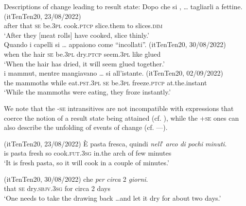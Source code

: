 \documentclass[output=paper,colorlinks,citecolor=brown
]{langscibook}
\begin{document}
\ea \label{bentley_example_25}
    Descriptions of change leading to result state:
    \ea  \label{bentley_example_25a}
    \gll Dopo che	si 		 		,  {\ldots}  tagliarli			a fettine. {(itTenTen20, 23/08/2022)} \\
   				after		that	\textsc{se}		be.3\textsc{pl}	cook.\textsc{ptcp}	{} slice.them	to	slices.\textsc{dim} {} \\
    \glt ‘After they [meat rolls] have cooked, slice thinly.’ \\
    \ex \label{bentley_example_25b}
    \gll Quando		i		capelli	si		 		  {\ldots}  appaiono		come “incollati”. {(itTenTen20, 30/08/2022)}\\
    when			the	hair			\textsc{se}		be.3\textsc{pl}	dry.\textsc{ptcp}	{}					seem.3\textsc{pl}		like			glued	{} \\
    \glt 					‘When the hair has dried, it will seem glued together.’ \\
    \ex \label{bentley_example_25c}
    \gll  {\ldots}  i			mammut,		mentre		mangiavano  {\ldots}  si 		 		 		all’istante. {(itTenTen20, 02/09/2022)} \\
    {} 									the	mammoths	while			eat.\textsc{pst}.3\textsc{pl}			{}			\textsc{se}		be.3\textsc{pl}	freeze.\textsc{ptcp}	 at.the.instant	{} \\
    \glt 									‘While the mammoths	 were eating, they froze instantly.’ \\
    \z
\z

We note that the -\textsc{se} intransitives are not incompatible with expressions that coerce the notion of a result state being attained (cf. ), while the +\textsc{se} ones can also describe the unfolding of events of change (cf. —).

\hspace*{\fill}(itTenTen20, 23/08/2022)\quad
\ea \label{bentley_example_26}
    \gll È	pasta	fresca,	quindi  					\textit{nell}’			\textit{arco}		\textit{di}	 	\textit{pochi} \textit{minuti}. \\
    		is	pasta	fresh		so					cook.\textsc{fut}.3\textsc{sg}	in.the		arch		of		few		minutes \\
    \glt ‘It is fresh pasta, so it will cook in a couple of minutes.’
\z

\hspace*{\fill}(itTenTen20, 30/08/2022)\quad
\ea \label{bentley_example_27}
      che									\textit{per}		\textit{circa}	2	\textit{giorni}. \\
    	{} 		that	\textsc{se}		dry.\textsc{sbjv}.3\textsc{sg}		for		circa	2	days \\
    \glt	‘One needs to take the drawing back \ldots  and let it dry for about two days.’
\z
\end{document}
